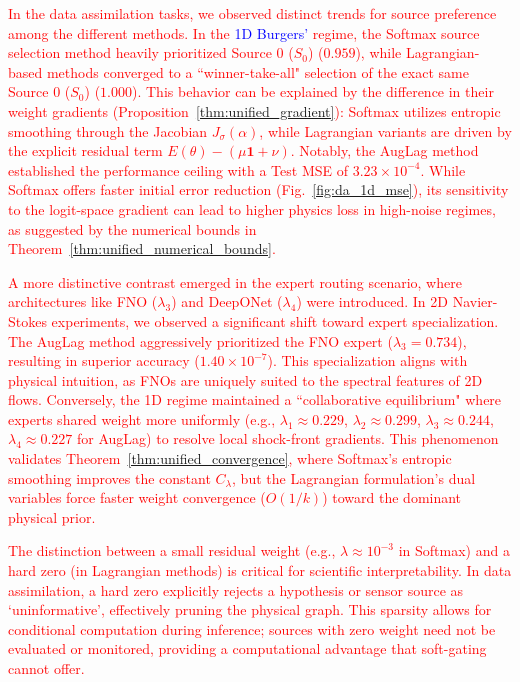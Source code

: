\documentclass[preprint,12pt,authoryear]{elsarticle}
\begin{document}
\textcolor{red}{In the data assimilation tasks, we observed distinct trends for source preference among the different methods. In the \textcolor{blue}{1D Burgers'} regime, the Softmax source selection method heavily prioritized Source 0 ($S_0$) ($0.959$), while Lagrangian-based methods converged to a ``winner-take-all" selection of the exact same Source 0 ($S_0$) ($1.000$). This behavior can be explained by the difference in their weight gradients (Proposition~\ref{thm:unified_gradient}): Softmax utilizes entropic smoothing through the Jacobian $J_\sigma(\alpha)$, while Lagrangian variants are driven by the explicit residual term $E(\theta) - (\mu\mathbf{1} + \nu)$. Notably, the AugLag method established the performance ceiling with a Test MSE of $3.23 \times 10^{-4}$. While Softmax offers faster initial error reduction (Fig.~\ref{fig:da_1d_mse}), its sensitivity to the logit-space gradient can lead to higher physics loss in high-noise regimes, as suggested by the numerical bounds in Theorem~\ref{thm:unified_numerical_bounds}.}

\textcolor{red}{A more distinctive contrast emerged in the expert routing scenario, where architectures like FNO ($\lambda_3$) and DeepONet ($\lambda_4$) were introduced. In 2D Navier-Stokes experiments, we observed a significant shift toward expert specialization. The AugLag method aggressively prioritized the FNO expert ($\lambda_3 = 0.734$), resulting in superior accuracy ($1.40 \times 10^{-7}$). This specialization aligns with physical intuition, as FNOs are uniquely suited to the spectral features of 2D flows. Conversely, the 1D regime maintained a ``collaborative equilibrium" where experts shared weight more uniformly (e.g., $\lambda_1 \approx 0.229$, $\lambda_2 \approx 0.299$, $\lambda_3 \approx 0.244$, $\lambda_4 \approx 0.227$ for AugLag) to resolve local shock-front gradients. This phenomenon validates Theorem~\ref{thm:unified_convergence}, where Softmax's entropic smoothing improves the constant $C_\lambda$, but the Lagrangian formulation's dual variables force faster weight convergence ($O(1/k)$) toward the dominant physical prior.}

\textcolor{red}{The distinction between a small residual weight (e.g., $\lambda \approx 10^{-3}$ in Softmax) and a hard zero (in Lagrangian methods) is critical for scientific interpretability. In data assimilation, a hard zero explicitly rejects a hypothesis or sensor source as `uninformative', effectively pruning the physical graph. This sparsity allows for conditional computation during inference; sources with zero weight need not be evaluated or monitored, providing a computational advantage that soft-gating cannot offer.}
\end{document}

